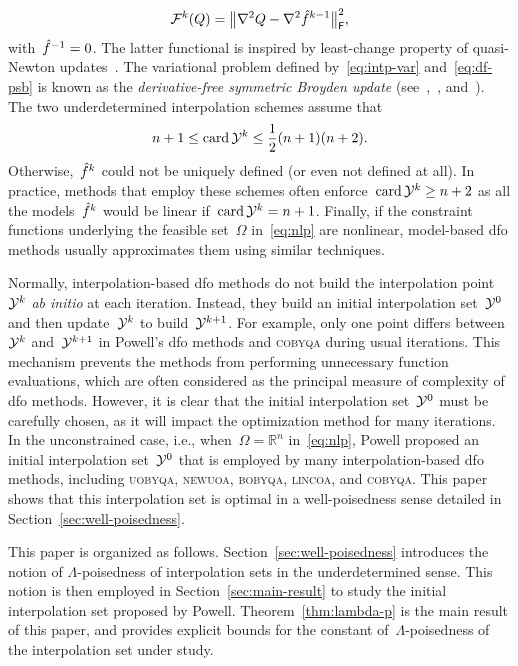 \documentclass[draft]{article}
\numberwithin{equation}{section}
\theoremstyle{definition}
\theoremstyle{plain}
\DeclareMathOperator{\card}{card}
\newcommand*{\fset}{\Omega}
\newcommand*{\norm}[2][]{#1\lVert#2#1\rVert}
\newcommand*{\obj}{f}
\newcommand*{\objm}[1][]{\hat{\obj}\ifblank{#1}{}{^{#1}}}
\newcommand*{\R}{\mathbb{R}}
\newcommand*{\solvername}[1]{\textsc{#1}\xspace}
\newcommand*{\xpt}[1][]{\mathcal{Y}\ifblank{#1}{}{^{#1}}}
\begin{document}
\begin{equation}
    \label{eq:df-psb}
    \mathcal{F}^k(Q) = \norm[\big]{\nabla^2 Q - \nabla^2 \objm[k - 1]}_{\mathsf{F}}^2,
\end{equation}
with~$\objm[-1] = 0$.
The latter functional is inspired by least-change property of quasi-Newton updates~\cite{Dennis_Schnabel_1979}.
The variational problem defined by~\eqref{eq:intp-var} and~\eqref{eq:df-psb} is known as the \emph{derivative-free symmetric Broyden update} (see~\cite{Powell_2013},~\cite[\S~3.6]{Zhang_2012}, and~\cite[\S~2.4.2]{Ragonneau_2022}).
The two underdetermined interpolation schemes assume that
\begin{equation*}
    n + 1 \le \card\xpt[k] \le \frac{1}{2} (n + 1) (n + 2).
\end{equation*}
Otherwise,~$\objm[k]$ could not be uniquely defined (or even not defined at all).
In practice, methods that employ these schemes often enforce~$\card\xpt[k] \ge n + 2$ as all the models~$\objm[k]$ would be linear if~$\card\xpt[k] = n + 1$.
Finally, if the constraint functions underlying the feasible set~$\fset$ in~\eqref{eq:nlp} are nonlinear, model-based \gls{dfo} methods usually approximates them using similar techniques.

Normally, interpolation-based \gls{dfo} methods do not build the interpolation point~$\xpt[k]$ \emph{ab initio} at each iteration.
Instead, they build an initial interpolation set~$\xpt[0]$ and then  update~$\xpt[k]$ to build~$\xpt[k + 1]$.
For example, only one point differs between~$\xpt[k]$ and~$\xpt[k + 1]$ in Powell's \gls{dfo} methods and \solvername{cobyqa} during usual iterations.
This mechanism prevents the methods from performing unnecessary function evaluations, which are often considered as the principal measure of complexity of \gls{dfo} methods.
However, it is clear that the initial interpolation set~$\xpt[0]$ must be carefully chosen, as it will impact the optimization method for many iterations.
In the unconstrained case, i.e., when~$\fset = \R^n$ in~\eqref{eq:nlp}, Powell proposed an initial interpolation set~$\xpt[0]$ that is employed by many interpolation-based \gls{dfo} methods, including \solvername{uobyqa}, \solvername{newuoa}, \solvername{bobyqa}, \solvername{lincoa}, and \solvername{cobyqa}.
This paper shows that this interpolation set is optimal in a well-poisedness sense detailed in Section~\ref{sec:well-poisedness}.

This paper is organized as follows.
Section~\ref{sec:well-poisedness} introduces the notion of $\Lambda$-poisedness of interpolation sets in the underdetermined sense.
This notion is then employed in Section~\ref{sec:main-result} to study the initial interpolation set proposed by Powell.
Theorem~\ref{thm:lambda-p} is the main result of this paper, and provides explicit bounds for the constant of~$\Lambda$-poisedness of the interpolation set under study.
\end{document}
